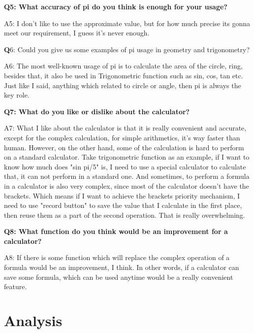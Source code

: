 \documentclass[12pt,letterpaper]{article}
\begin{document}
\textbf {Q5: What accuracy of pi do you think is enough for your usage?} 

A5: I don't like to use the approximate value, but for how much precise its gonna meet our requirement, I guess it's never enough.

\textbf Q6: Could you give us some examples of pi usage in geometry and trigonometry? 

A6: The most well-known usage of pi is to calculate the area of the circle, ring, besides that,  it also be used in Trigonometric function such as sin, cos, tan etc. Just like I said, anything which related to circle or angle, then pi is always the key role.

\textbf{Q7: What do you like or dislike about the calculator?}

A7: What I like about the calculator is that it is really convenient and accurate, except for the complex calculation, for simple arithmetics, it's way faster than human.  However, on the other hand, some of the calculation is hard to perform on a standard calculator. Take trigonometric function as an example, if I want to know how much does "sin pi/5" is, I need to use a special calculator to calculate that, it can not perform in a standard one. And sometimes, to perform a formula in a calculator is also very complex, since most of the calculator doesn't have the brackets. Which means if I want to achieve the brackets priority mechanism, I need to use "record button" to save the value that I calculate in the first place, then reuse them as a part of the second operation. That is really overwhelming.

\textbf {Q8: What function do you think would be an improvement for a calculator?}

A8: If there is some function which will replace the complex operation of a formula would be an improvement, I think. In other words,  if a calculator can save some formula, which can be used anytime would be a really convenient feature. 




\section*{Analysis}
\end{document}
